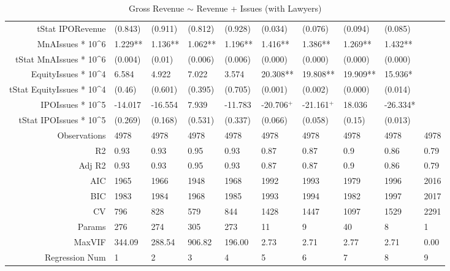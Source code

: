 \begin{table}[ht]
\begin{tabular}{rlllllllll}
  tStat IPORevenue & (0.843) & (0.911) & (0.812) & (0.928) & (0.034) & (0.076) & (0.094) & (0.085) &  \\ 
  MnAIssues * 10^6 & 1.229** & 1.136** & 1.062** & 1.196** & 1.416** & 1.386** & 1.269** & 1.432** &  \\ 
  tStat MnAIssues * 10^6 & (0.004) & (0.01) & (0.006) & (0.006) & (0.000) & (0.000) & (0.000) & (0.000) &  \\ 
  EquityIssues * 10^4 & 6.584 & 4.922 & 7.022 & 3.574 & 20.308** & 19.808** & 19.909** & 15.936* &  \\ 
  tStat EquityIssues * 10^4 & (0.46) & (0.601) & (0.395) & (0.705) & (0.001) & (0.002) & (0.000) & (0.014) &  \\ 
  IPOIssues * 10^5 & -14.017 & -16.554 & 7.939 & -11.783 & -20.706$^{+}$ & -21.161$^{+}$ & 18.036 & -26.334* &  \\ 
  tStat IPOIssues * 10^5 & (0.269) & (0.168) & (0.531) & (0.337) & (0.066) & (0.058) & (0.15) & (0.013) &  \\ 
  Observations & 4978 & 4978 & 4978 & 4978 & 4978 & 4978 & 4978 & 4978 & 4978 \\ 
  R2 & 0.93 & 0.93 & 0.95 & 0.93 & 0.87 & 0.87 & 0.9 & 0.86 & 0.79 \\ 
  Adj R2 & 0.93 & 0.93 & 0.95 & 0.93 & 0.87 & 0.87 & 0.9 & 0.86 & 0.79 \\ 
  AIC & 1965 & 1966 & 1948 & 1968 & 1992 & 1993 & 1979 & 1996 & 2016 \\ 
  BIC & 1983 & 1984 & 1968 & 1985 & 1993 & 1994 & 1982 & 1997 & 2017 \\ 
  CV & 796 & 828 & 579 & 844 & 1428 & 1447 & 1097 & 1529 & 2291 \\ 
  Params & 276 & 274 & 305 & 273 & 11 & 9 & 40 & 8 & 1 \\ 
  MaxVIF & 344.09 & 288.54 & 906.82 & 196.00 & 2.73 & 2.71 & 2.77 & 2.71 & 0.00 \\ 
  Regression Num & 1 & 2 & 3 & 4 & 5 & 6 & 7 & 8 & 9 \\ 
   \hline
\end{tabular}
\caption{Gross Revenue $\sim$ Revenue + Issues (with Lawyers)} 
\end{table}
